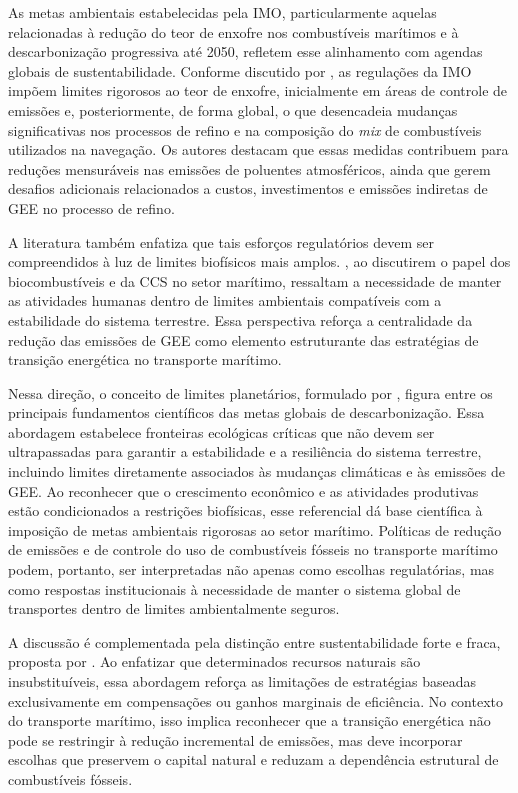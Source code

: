 As metas ambientais estabelecidas pela \gls{IMO}, particularmente aquelas relacionadas à redução do teor de enxofre nos combustíveis marítimos e à descarbonização progressiva até 2050, refletem esse alinhamento com agendas globais de sustentabilidade. Conforme discutido por \citet{van_global_2019}, as regulações da \gls{IMO} impõem limites rigorosos ao teor de enxofre, inicialmente em áreas de controle de emissões e, posteriormente, de forma global, o que desencadeia mudanças significativas nos processos de refino e na composição do \emph{mix} de combustíveis utilizados na navegação. Os autores destacam que essas medidas contribuem para reduções mensuráveis nas emissões de poluentes atmosféricos, ainda que gerem desafios adicionais relacionados a custos, investimentos e emissões indiretas de \gls{GEE} no processo de refino.

A literatura também enfatiza que tais esforços regulatórios devem ser compreendidos à luz de limites biofísicos mais amplos. \citet{mukherjee_perspective_2020}, ao discutirem o papel dos biocombustíveis e da \gls{CCS} no setor marítimo, ressaltam a necessidade de manter as atividades humanas dentro de limites ambientais compatíveis com a estabilidade do sistema terrestre. Essa perspectiva reforça a centralidade da redução das emissões de \gls{GEE} como elemento estruturante das estratégias de transição energética no transporte marítimo.

Nessa direção, o conceito de limites planetários, formulado por \citet{rockstrom_safe_2009}, figura entre os principais fundamentos científicos das metas globais de descarbonização. Essa abordagem estabelece fronteiras ecológicas críticas que não devem ser ultrapassadas para garantir a estabilidade e a resiliência do sistema terrestre, incluindo limites diretamente associados às mudanças climáticas e às emissões de \gls{GEE}. Ao reconhecer que o crescimento econômico e as atividades produtivas estão condicionados a restrições biofísicas, esse referencial dá base científica à imposição de metas ambientais rigorosas ao setor marítimo. Políticas de redução de emissões e de controle do uso de combustíveis fósseis no transporte marítimo podem, portanto, ser interpretadas não apenas como escolhas regulatórias, mas como respostas institucionais à necessidade de manter o sistema global de transportes dentro de limites ambientalmente seguros.

A discussão é complementada pela distinção entre sustentabilidade forte e fraca, proposta por \citet{daly_sustainable_2006}. Ao enfatizar que determinados recursos naturais são insubstituíveis, essa abordagem reforça as limitações de estratégias baseadas exclusivamente em compensações ou ganhos marginais de eficiência. No contexto do transporte marítimo, isso implica reconhecer que a transição energética não pode se restringir à redução incremental de emissões, mas deve incorporar escolhas que preservem o capital natural e reduzam a dependência estrutural de combustíveis fósseis.

